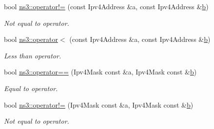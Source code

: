 \begin{DoxyCompactItemize}
bool \hyperlink{namespacens3_a1f38a9783a34395b51ee44d7bd82c016}{ns3\+::operator!=} (const Ipv4\+Address \&a, const Ipv4\+Address \&\hyperlink{lte__pathloss_8m_a21ad0bd836b90d08f4cf640b4c298e7c}{b})
\begin{DoxyCompactList}\small\item\em Not equal to operator. \end{DoxyCompactList}\item 
bool \hyperlink{namespacens3_a680697cf38a876112fc20f5feaedae4d}{ns3\+::operator$<$} (const Ipv4\+Address \&a, const Ipv4\+Address \&\hyperlink{lte__pathloss_8m_a21ad0bd836b90d08f4cf640b4c298e7c}{b})
\begin{DoxyCompactList}\small\item\em Less than operator. \end{DoxyCompactList}\item 
bool \hyperlink{namespacens3_aa47870b17293b613f3e25b0b86af8100}{ns3\+::operator==} (Ipv4\+Mask const \&a, Ipv4\+Mask const \&\hyperlink{lte__pathloss_8m_a21ad0bd836b90d08f4cf640b4c298e7c}{b})
\begin{DoxyCompactList}\small\item\em Equal to operator. \end{DoxyCompactList}\item 
bool \hyperlink{namespacens3_a378c3f13d818eb2145963850b481b8c9}{ns3\+::operator!=} (Ipv4\+Mask const \&a, Ipv4\+Mask const \&\hyperlink{lte__pathloss_8m_a21ad0bd836b90d08f4cf640b4c298e7c}{b})
\begin{DoxyCompactList}\small\item\em Not equal to operator. \end{DoxyCompactList}\end{DoxyCompactItemize}
